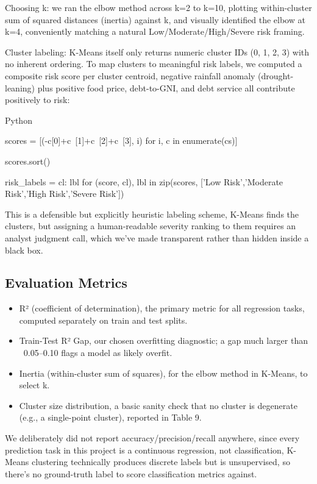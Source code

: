 \documentclass[12pt,a4paper]{article}
\begin{document}
Choosing k: we ran the elbow method across k=2 to k=10, plotting within-cluster sum of squared distances (inertia) against k, and visually identified the elbow at k=4, conveniently matching a natural Low/Moderate/High/Severe risk framing.

Cluster labeling: K-Means itself only returns numeric cluster IDs (0, 1, 2, 3) with no inherent ordering. To map clusters to meaningful risk labels, we computed a composite risk score per cluster centroid, negative rainfall anomaly (drought-leaning) plus positive food price, debt-to-GNI, and debt service all contribute positively to risk:

Python

scores = [(-c[0]+c~[1]+c~[2]+c~[3], i) for i, c in enumerate(cs)]

scores.sort()

risk\_labels = {cl: lbl for (score, cl), lbl in zip(scores, ['Low Risk','Moderate Risk','High Risk','Severe Risk'])}

This is a defensible but explicitly heuristic labeling scheme, K-Means finds the clusters, but assigning a human-readable severity ranking to them requires an analyst judgment call, which we've made transparent rather than hidden inside a black box.


\subsection{Evaluation Metrics}
\begin{itemize}[leftmargin=2em]
  \item R² (coefficient of determination), the primary metric for all regression tasks, computed separately on train and test splits.
  \item Train-Test R² Gap, our chosen overfitting diagnostic; a gap much larger than ~0.05–0.10 flags a model as likely overfit.
  \item Inertia (within-cluster sum of squares), for the elbow method in K-Means, to select k.
  \item Cluster size distribution, a basic sanity check that no cluster is degenerate (e.g., a single-point cluster), reported in Table 9.
\end{itemize}

We deliberately did not report accuracy/precision/recall anywhere, since every prediction task in this project is a continuous regression, not classification, K-Means clustering technically produces discrete labels but is unsupervised, so there's no ground-truth label to score classification metrics against.
\end{document}
